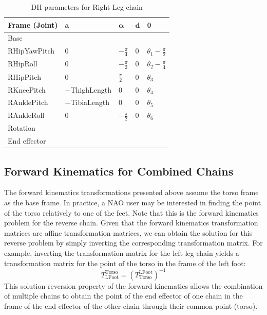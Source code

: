 \begin{table}[!t]
\centering
\caption{DH parameters for Right Leg chain}
\begin{tabular}{|l|>{\centering\arraybackslash}m{2.55cm}|>{\centering\arraybackslash}m{2.55cm}|>{\centering\arraybackslash}m{2.55cm}|>{\centering\arraybackslash}m{2.55cm}|}
\hline
\textbf{Frame (Joint)} & $\mathbf{a}$ & $\boldsymbol{\alpha}$ & $\mathbf{d}$ & $\boldsymbol{\theta}$\\ \hline
Base & \multicolumn{4}{c|}{$A(0,\text{\footnotesize{$-$HipOffsetY}},\text{\footnotesize{$-$HipOffsetZ}})$} \\ \hline
RHipYawPitch & $0$ & $-\frac{\pi}{4}$ & $0$ & $\theta_1 - \frac{\pi}{2}$ \\ \hline
RHipRoll & $0$ & $-\frac{\pi}{2}$ & $0$ & $\theta_2 - \frac{\pi}{4}$ \\ \hline
RHipPitch & $0$ & $\frac{\pi}{2}$ & $0$ & $\theta_3$ \\ \hline
RKneePitch & \footnotesize{$-$ThighLength} & $0$ & $0$ & $\theta_4$ \\ \hline
RAnklePitch & \footnotesize{$-$TibiaLength} & $0$ & $0$ & $\theta_5$ \\ \hline
RAnkleRoll & $0$ & $-\frac{\pi}{2}$ & $0$ & $\theta_6$ \\ \hline
Rotation & \multicolumn{4}{c|}{$R_z(\pi)R_y(-\tfrac{\pi}{2})$} \\ \hline
End effector & \multicolumn{4}{c|}{$A(0,0,\text{\footnotesize{$-$FootHeight}})$} \\ \hline
\end{tabular}
\label{tab:DHrleg}
\end{table}


\subsection{Forward Kinematics for Combined Chains}
The forward kinematics transformations presented above assume the torso frame as the base frame. In practice, a NAO user may be interested in finding the point of the torso relatively to one of the feet. Note that this is the forward kinematics problem for the reverse chain. Given that the forward kinematics transformation matrices are affine transformation matrices, we can obtain the solution for this reverse problem by simply inverting the corresponding transformation matrix. 
For example, inverting the transformation matrix for the left leg chain yields a transformation matrix for the point of the torso in the frame of the left foot: 
\[
T^\text{Torso}_\text{LFoot} = {\left(T^\text{LFoot}_\text{Torso}\right)}^{-1}
\]
This solution reversion property of the forward kinematics allows the combination of multiple chains to obtain the point of the end effector of one chain in the frame of the end effector of the other chain through their common point (torso). 


